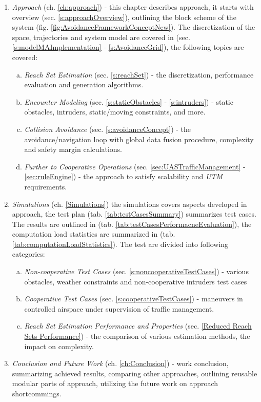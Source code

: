 \begin{enumerate}
    \item \emph{Approach} (ch. \ref{ch:approach}) - this chapter describes approach, it starts with overview (sec. \ref{s:approachOverview}), outlining the block scheme of the system (fig. \ref{fig:AvoidanceFrameworkConceptNew}). The discretization of the space, trajectories and system model are covered in (sec. \ref{s:modelMAImplementation} - \ref{s:AvoidanceGrid}), the following topics are covered:
    \begin{enumerate}[a.]
        \item \emph{Reach Set Estimation} (sec. \ref{s:reachSet}) - the discretization, performance evaluation and generation algorithms.
        
        \item \emph{Encounter Modeling} (sec. \ref{s:staticObstacles} - \ref{s:intruders}) - static obstacles, intruders, static/moving constraints, and more.
        
        \item \emph{Collision Avoidance} (sec. \ref{s:avoidanceConcept}) - the avoidance/navigation loop with global data fusion procedure, complexity and safety margin calculations.
        
        \item \emph{Further to Cooperative Operations} (sec. \ref{sec:UASTrafficManagement} - \ref{sec:ruleEngine}) - the approach to satisfy scalability and \emph{UTM} requirements.
    \end{enumerate}
    
    \item \emph{Simulations} (ch. \ref{Simulations}) the simulations covers aspects developed in approach, the test plan (tab. \ref{tab:testCasesSummary}) summarizes test cases. The results are outlined in (tab. \ref{tab:testCasesPerformacneEvaluation}), the computation load statistics are summarized in (tab. \ref{tab:computationLoadStatistics}). The test are divided into following categories:
    
    \begin{enumerate}[a.]
        \item \emph{Non-cooperative Test Cases} (sec. \ref{s:noncooperativeTestCases}) - various obstacles, weather constraints and non-cooperative intruders test cases
    
        \item \emph{Cooperative Test Cases} (sec. \ref{s:cooperativeTestCases}) - maneuvers in controlled airspace under supervision of traffic management.
    
        \item \emph{Reach Set Estimation Performance and Properties} (sec. \ref{Reduced Reach Sets Performance}) - the comparison of various estimation methods, the impact on complexity.
    \end{enumerate}
    
    \item \emph{Conclusion and Future Work} (ch. \ref{ch:Conclusion}) - work conclusion, summarizing achieved results, comparing other approaches, outlining reusable modular parts of approach, utilizing the future work on approach shortcommings.
\end{enumerate}